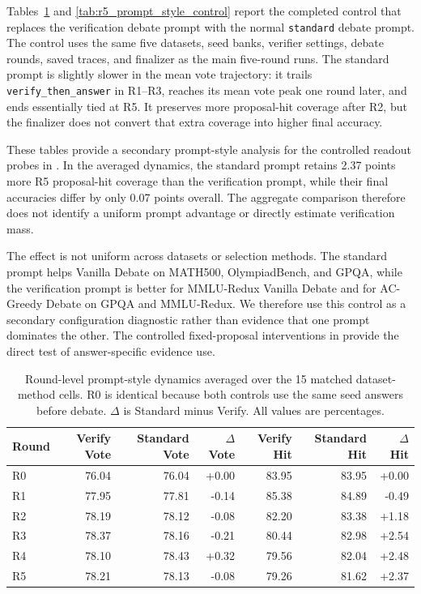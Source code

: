 Tables~\ref{tab:r5_prompt_style_dynamics} and
\ref{tab:r5_prompt_style_control} report the completed control that replaces
the verification debate prompt with the normal \texttt{standard} debate prompt.
The control uses the same five datasets, seed banks, verifier settings, debate
rounds, saved traces, and finalizer as the main five-round runs. The standard
prompt is slightly slower in the mean vote trajectory: it trails
\texttt{verify\_then\_answer} in R1--R3, reaches its mean vote peak one round
later, and ends essentially tied at R5. It preserves more proposal-hit coverage
after R2, but the finalizer does not convert that extra coverage into higher
final accuracy.

These tables provide a secondary prompt-style analysis for the controlled
readout probes in . In the averaged
dynamics, the standard prompt retains 2.37 points more R5 proposal-hit coverage
than the verification prompt, while their final accuracies differ by only 0.07
points overall. The aggregate comparison therefore does not identify a uniform
prompt advantage or directly estimate verification mass.

The effect is not uniform across datasets or selection methods. The standard
prompt helps Vanilla Debate on MATH500, OlympiadBench, and GPQA, while the
verification prompt is better for MMLU-Redux Vanilla Debate and for
AC-Greedy Debate on GPQA and MMLU-Redux. We therefore use this control as a
secondary configuration diagnostic rather than evidence that one prompt
dominates the other. The controlled fixed-proposal interventions in
 provide the direct test of
answer-specific evidence use.

\begin{table}[t]
\centering
\caption{Round-level prompt-style dynamics averaged over the 15 matched
dataset-method cells. R0 is identical because both controls use the same seed
answers before debate. $\Delta$ is Standard minus Verify. All values are
percentages.}
\small
\begin{tabular}{lrrrrrr}
\toprule
Round & Verify Vote & Standard Vote & $\Delta$ Vote & Verify Hit & Standard Hit & $\Delta$ Hit \\
\midrule
R0 & 76.04 & 76.04 & +0.00 & 83.95 & 83.95 & +0.00 \\
R1 & 77.95 & 77.81 & -0.14 & 85.38 & 84.89 & -0.49 \\
R2 & 78.19 & 78.12 & -0.08 & 82.20 & 83.38 & +1.18 \\
R3 & 78.37 & 78.16 & -0.21 & 80.44 & 82.98 & +2.54 \\
R4 & 78.10 & 78.43 & +0.32 & 79.56 & 82.04 & +2.48 \\
R5 & 78.21 & 78.13 & -0.08 & 79.26 & 81.62 & +2.37 \\
\bottomrule
\end{tabular}
\label{tab:r5_prompt_style_dynamics}
\end{table}

